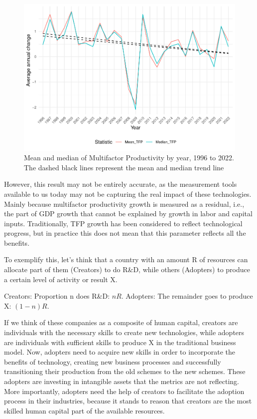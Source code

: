 \documentclass[preprint, 3p,
authoryear]{elsarticle} %
\begin{document}
\begin{figure}

{\centering \includegraphics{Document_files/figure-latex/fig5-1} 

}

\caption{\label{fig5}Mean and median of Multifactor Productivity by year, 1996 to 2022. The dashed black lines represent the mean and median trend line}\label{fig:fig5}
\end{figure}

However, this result may not be entirely accurate, as the measurement
tools available to us today may not be capturing the real impact of
these technologies. Mainly because multifactor productivity growth is
measured as a residual, i.e., the part of GDP growth that cannot be
explained by growth in labor and capital inputs. Traditionally, TFP
growth has been considered to reflect technological progress, but in
practice this does not mean that this parameter reflects all the
benefits.

To exemplify this, let's think that a country with an amount R of
resources can allocate part of them (Creators) to do R\&D, while others
(Adopters) to produce a certain level of activity or result X.

Creators: Proportion n does R\&D: \(nR\). Adopters: The remainder goes
to produce X: \((1-n)R\).

If we think of these companies as a composite of human capital, creators
are individuals with the necessary skills to create new technologies,
while adopters are individuals with sufficient skills to produce X in
the traditional business model. Now, adopters need to acquire new skills
in order to incorporate the benefits of technology, creating new
business processes and successfully transitioning their production from
the old schemes to the new schemes. These adopters are investing in
intangible assets that the metrics are not reflecting. More importantly,
adopters need the help of creators to facilitate the adoption process in
their industries, because it stands to reason that creators are the most
skilled human capital part of the available resources.
\end{document}
